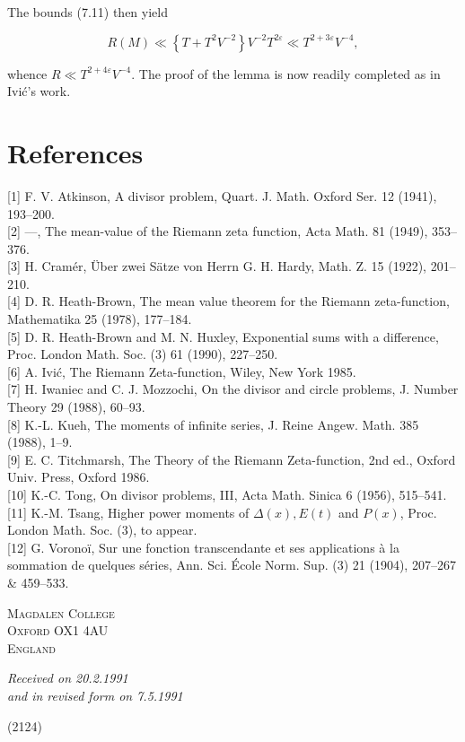 \documentclass[10pt]{article}
\begin{document}
The bounds (7.11) then yield

$$
R(M) \ll\left\{T+T^{2} V^{-2}\right\} V^{-2} T^{2 \varepsilon} \ll T^{2+3 \varepsilon} V^{-4},
$$

whence $R \ll T^{2+4 \varepsilon} V^{-4}$. The proof of the lemma is now readily completed as in Ivić's work.

\section*{References}
[1] F. V. Atkinson, A divisor problem, Quart. J. Math. Oxford Ser. 12 (1941), 193--200.\\[0pt]
[2] ---, The mean-value of the Riemann zeta function, Acta Math. 81 (1949), 353--376.\\[0pt]
[3] H. Cramér, Über zwei Sätze von Herrn G. H. Hardy, Math. Z. 15 (1922), 201--210.\\[0pt]
[4] D. R. Heath-Brown, The mean value theorem for the Riemann zeta-function, Mathematika 25 (1978), 177--184.\\[0pt]
[5] D. R. Heath-Brown and M. N. Huxley, Exponential sums with a difference, Proc. London Math. Soc. (3) 61 (1990), 227--250.\\[0pt]
[6] A. Ivić, The Riemann Zeta-function, Wiley, New York 1985.\\[0pt]
[7] H. Iwaniec and C. J. Mozzochi, On the divisor and circle problems, J. Number Theory 29 (1988), 60--93.\\[0pt]
[8] K.-L. Kueh, The moments of infinite series, J. Reine Angew. Math. 385 (1988), 1--9.\\[0pt]
[9] E. C. Titchmarsh, The Theory of the Riemann Zeta-function, 2nd ed., Oxford Univ. Press, Oxford 1986.\\[0pt]
[10] K.-C. Tong, On divisor problems, III, Acta Math. Sinica 6 (1956), 515--541.\\[0pt]
[11] K.-M. Tsang, Higher power moments of $\Delta(x), E(t)$ and $P(x)$, Proc. London Math. Soc. (3), to appear.\\[0pt]
[12] G. Voronoï, Sur une fonction transcendante et ses applications à la sommation de quelques séries, Ann. Sci. École Norm. Sup. (3) 21 (1904), 207--267 \& 459--533.

\bigskip
\begin{flushleft}
\textsc{Magdalen College}\\
\textsc{Oxford OX1 4AU}\\
\textsc{England}
\end{flushleft}

\begin{center}
\emph{Received on 20.2.1991}\\
\emph{and in revised form on 7.5.1991}
\end{center}

\begin{flushright}
(2124)
\end{flushright}
\end{document}
